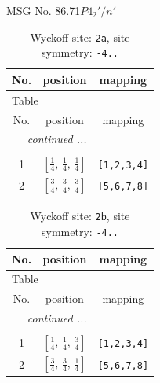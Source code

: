 \documentclass[fleqn,8pt]{jsarticle}
\begin{document}
\setcounter{MaxMatrixCols}{32}

\renewcommand{\tablename}{Table~}
\renewcommand{\figurename}{Figure~}
\begin{center}
\LARGE
MSG No. 86.71\quad$P4_{2}'/n'$
\end{center}
\renewcommand{\arraystretch}{1.2}
\begin{longtable}{ccc}
\caption{Wyckoff site: {\tt 2a}, site symmetry: {\tt -4..}}
 \\
 \hline \hline
No. & position & mapping \\ \hline \endfirsthead

\multicolumn{2}{l}{\tablename\ \thetable{}} \\
 \hline \hline
No. & position & mapping \\ \hline \endhead

 \hline \hline
\multicolumn{2}{r}{\footnotesize\it continued ...} \\ \endfoot

 \hline \hline
\multicolumn{2}{r}{} \\ \endlastfoot

1 & $\left[ \frac{1}{4},\, \frac{1}{4},\, \frac{1}{4} \right]$ & {\tt [1,2,3,4]} \\ \hline
2 & $\left[ \frac{3}{4},\, \frac{3}{4},\, \frac{3}{4} \right]$ & {\tt [5,6,7,8]} \\
\end{longtable}
\renewcommand{\arraystretch}{1.2}
\begin{longtable}{ccc}
\caption{Wyckoff site: {\tt 2b}, site symmetry: {\tt -4..}}
 \\
 \hline \hline
No. & position & mapping \\ \hline \endfirsthead

\multicolumn{2}{l}{\tablename\ \thetable{}} \\
 \hline \hline
No. & position & mapping \\ \hline \endhead

 \hline \hline
\multicolumn{2}{r}{\footnotesize\it continued ...} \\ \endfoot

 \hline \hline
\multicolumn{2}{r}{} \\ \endlastfoot

1 & $\left[ \frac{1}{4},\, \frac{1}{4},\, \frac{3}{4} \right]$ & {\tt [1,2,3,4]} \\ \hline
2 & $\left[ \frac{3}{4},\, \frac{3}{4},\, \frac{1}{4} \right]$ & {\tt [5,6,7,8]} \\
\end{longtable}
\end{document}
